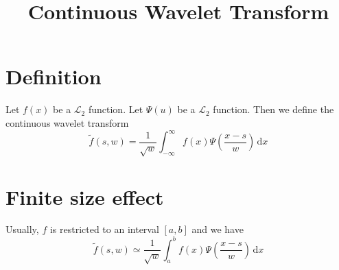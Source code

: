 \documentclass{revtex4}
\begin{document}
	\title{Continuous Wavelet Transform}
	\maketitle

\section{Definition}
Let $f(x)$ be a $\mathcal{L}_2$ function. Let $\Psi(u)$ be a $\mathcal{L}_2$ function.
Then we define the continuous wavelet transform
\begin{equation}
	\tilde{f}(s,w) = \dfrac{1}{\sqrt{w}}
	\int_{-\infty}^{\infty} f(x)\Psi\left(\dfrac{x-s}{w}\right) \, \mathrm{d}x
\end{equation}

\section{Finite size effect}
Usually, $f$ is restricted to an interval $[a,b]$ and we have
\begin{equation}
	\tilde{f}(s,w) \simeq \dfrac{1}{\sqrt{w}}
	\int_{a}^{b} f(x)\Psi\left(\dfrac{x-s}{w}\right) \, \mathrm{d}x
\end{equation}
\end{document}
